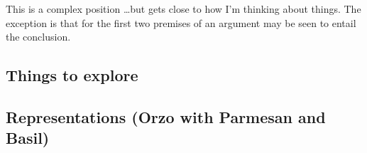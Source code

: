 \documentclass[10pt]{article}
\newcommand{\hozline}[0]{%
  \noindent\hdashrule[0.5ex][c]{\textwidth}{.1pt}{}
}
\begin{document}
This is a complex position \dots but gets close to how I'm thinking about things.
The exception is that for \citeauthor{Von-Wright:1972aa} the first two premises of an argument may be seen to entail the conclusion.

\hozline









\newpage

\subsection*{Things to explore}
\label{sec:things-explore}


\hozline



\subsection*{Representations \hfill (Orzo with Parmesan and Basil)}\mbox{ }
\end{document}
